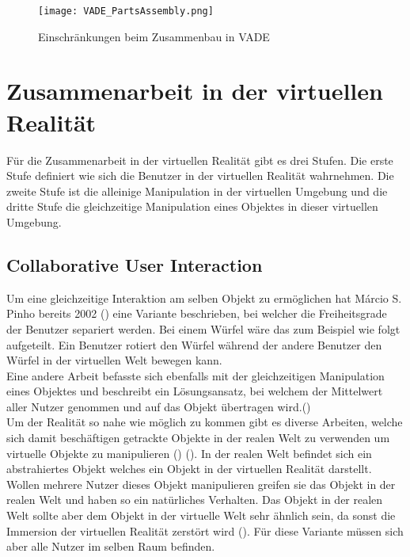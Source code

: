 \begin{figure}[h!]
	\centering
	\texttt{[image: VADE\_PartsAssembly.png]}
	\caption{Einschränkungen beim Zusammenbau in VADE}
	\label{fig:VADEAssembly}
\end{figure} 

\section{Zusammenarbeit in der virtuellen Realität}
Für die Zusammenarbeit in der virtuellen Realität gibt es drei Stufen. Die erste Stufe definiert wie sich die Benutzer in der virtuellen Realität wahrnehmen. Die zweite Stufe ist die alleinige Manipulation in der virtuellen Umgebung und die dritte Stufe die gleichzeitige Manipulation eines Objektes in dieser virtuellen Umgebung. 

\subsection{Collaborative User Interaction}
\label{ch:collaborative_user_interaction}
Um eine gleichzeitige Interaktion am selben Objekt zu ermöglichen hat Márcio S. Pinho bereits 2002 (\cite{pinho_cooperative_2002}) eine Variante beschrieben, bei welcher die Freiheitsgrade der Benutzer separiert werden. Bei einem Würfel wäre das zum Beispiel wie folgt aufgeteilt. Ein Benutzer rotiert den Würfel während der andere Benutzer den Würfel in der virtuellen Welt bewegen kann. \\
 
\noindent Eine andere Arbeit befasste sich ebenfalls mit der gleichzeitigen Manipulation eines Objektes und beschreibt ein Lösungsansatz, bei welchem der Mittelwert aller Nutzer genommen und auf das Objekt übertragen wird.(\cite{ruddle_symmetric_2002}) \\
 
\noindent Um der Realität so nahe wie möglich zu kommen gibt es diverse Arbeiten, welche sich damit beschäftigen getrackte Objekte in der realen Welt zu verwenden um virtuelle Objekte zu manipulieren (\cite{he_physhare:_2017}) (\cite{podkosova_immersivedeck:_2016}). In der realen Welt befindet sich ein abstrahiertes Objekt welches ein Objekt in der virtuellen Realität darstellt. Wollen mehrere Nutzer dieses Objekt manipulieren greifen sie das Objekt in der realen Welt und haben so ein natürliches Verhalten. Das Objekt in der realen Welt sollte aber dem Objekt in der virtuelle Welt sehr ähnlich sein, da sonst die Immersion der virtuellen Realität zerstört wird (\cite{simeone_substitutional_2015}). Für diese Variante müssen sich aber alle Nutzer im selben Raum befinden.
\pagebreak
